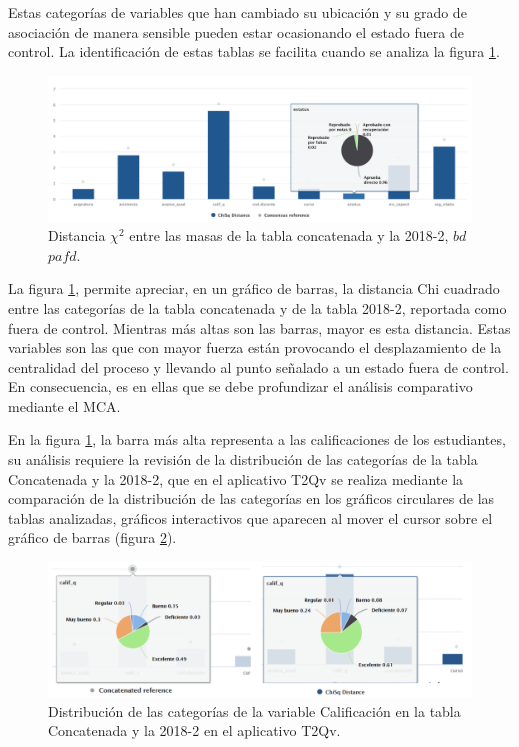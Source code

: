 \documentclass[mathematics,article,submit,moreauthors,pdftex]{mdpi}
\begin{document}
Estas categorías de variables que han cambiado su ubicación y su grado
de asociación de manera sensible pueden estar ocasionando el estado
fuera de control. La identificación de estas tablas se facilita cuando
se analiza la figura \ref{fig:chisqedu}.

\begin{figure}[H]


\begin{center}\includegraphics[width=0.9\linewidth,]{chisq_edu} \end{center}

\caption{Distancia $\chi^{2}$ entre las masas de la tabla concatenada y la 2018-2, $bd$ $pafd$.}
\label{fig:chisqedu}
\end{figure}

La figura \ref{fig:chisqedu}, permite apreciar, en un gráfico de barras,
la distancia Chi cuadrado entre las categorías de la tabla concatenada y
de la tabla 2018-2, reportada como fuera de control. Mientras más altas
son las barras, mayor es esta distancia. Estas variables son las que con
mayor fuerza están provocando el desplazamiento de la centralidad del
proceso y llevando al punto señalado a un estado fuera de control. En
consecuencia, es en ellas que se debe profundizar el análisis
comparativo mediante el MCA.

En la figura \ref{fig:chisqedu}, la barra más alta representa a las
calificaciones de los estudiantes, su análisis requiere la revisión de
la distribución de las categorías de la tabla Concatenada y la 2018-2,
que en el aplicativo T2Qv se realiza mediante la comparación de la
distribución de las categorías en los gráficos circulares de las tablas
analizadas, gráficos interactivos que aparecen al mover el cursor sobre
el gráfico de barras (figura \ref{fig:dist20182}).

\begin{figure}[H]


\begin{center}\includegraphics[width=0.9\linewidth,]{dist20182} \end{center}

\caption{Distribución de las categorías de la variable Calificación en la tabla Concatenada y la 2018-2 en el aplicativo T2Qv.}
\label{fig:dist20182}
\end{figure}
\end{document}
